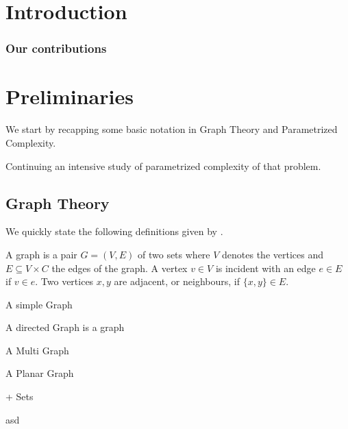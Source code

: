 \chapter{Introduction}

\subsection*{Our contributions}

\chapter{Preliminaries}
We start by recapping some basic notation in Graph Theory and Parametrized Complexity. 

Continuing an intensive study of parametrized complexity of that problem. 

\section{Graph Theory}
We quickly state the following definitions given by {\cite[p.~xxx]{diestel10}}.

\begin{definition}[Graph]
A graph is a pair $G = (V, E)$ of two sets where $V$ denotes the vertices and $E \subseteq V \times C$ the edges of the graph.  A vertex $v \in V$ is incident with an edge $e \in E$ if $v \in e$. Two vertices $x, y$ are adjacent, or neighbours, if $\{x,y \} \in E$.
\end{definition}

\begin{definition}
    A simple Graph

    A directed Graph is a graph

    A Multi Graph

    A Planar Graph
\end{definition}

\begin{definition}
\end{definition}

\begin{definition}
+ Sets
\end{definition}

\begin{definition}
    asd
\end{definition}

